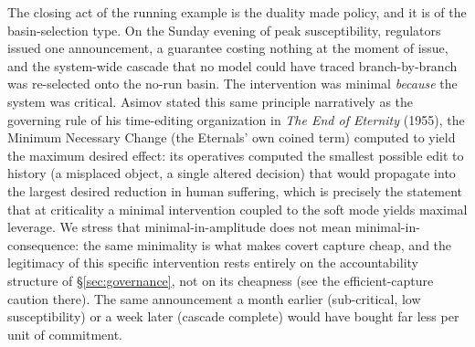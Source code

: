 \documentclass[11pt]{article}
\begin{document}
The closing act of the running example is the duality made policy, and it is of the basin-selection type. On the Sunday evening of peak susceptibility, regulators issued one announcement, a guarantee costing nothing at the moment of issue, and the system-wide cascade that no model could have traced branch-by-branch was re-selected onto the no-run basin. The intervention was minimal \emph{because} the system was critical. Asimov stated this same principle narratively as the governing rule of his time-editing organization in \emph{The End of Eternity} (1955), the Minimum Necessary Change (the Eternals' own coined term) computed to yield the maximum desired effect: its operatives computed the smallest possible edit to history (a misplaced object, a single altered decision) that would propagate into the largest desired reduction in human suffering, which is precisely the statement that at criticality a minimal intervention coupled to the soft mode yields maximal leverage. We stress that minimal-in-amplitude does not mean minimal-in-consequence: the same minimality is what makes covert capture cheap, and the legitimacy of this specific intervention rests entirely on the accountability structure of \S\ref{sec:governance}, not on its cheapness (see the efficient-capture caution there). The same announcement a month earlier (sub-critical, low susceptibility) or a week later (cascade complete) would have bought far less per unit of commitment.
\end{document}
